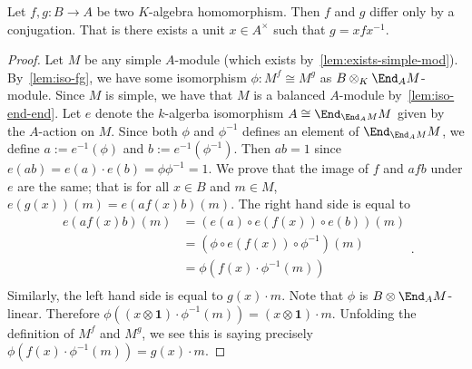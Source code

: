 \begin{theorem}\label{thm:skolem-noether}
  Let $f, g : B \to A$ be two $K$-algebra homomorphism. Then $f$ and $g$ differ
  only by a conjugation. That is there exists a unit $x \in A^{\times}$ such
  that $g = x f x^{-1}$.
  \leanok
\end{theorem}

\begin{proof}
  Let $M$ be any simple $A$-module (which exists
  by~\cref{lem:exists-simple-mod}). By~\cref{lem:iso-fg}, we have some
  isomorphism $\phi : M^{f}\cong M^{g}$ as $B\otimes_{K}\End_{A}M$-module. Since
  $M$ is simple, we have that $M$ is a balanced $A$-module
  by~\cref{lem:iso-end-end}. Let $e$ denote the $k$-algerba isomorphism
  $A \cong \End_{\End_{A}M}M$ given by the $A$-action on $M$. Since both $\phi$
  and $\phi^{-1}$ defines an element of $\End_{\End_{A}M}M$, we define
  $a := e^{-1}(\phi)$ and $b := e^{-1}(\phi^{-1})$. Then $ab = 1$ since
  $e(ab)=e(a)\cdot e(b)=\phi\phi^{-1}=1$. We prove that the image of $f$ and
  $afb$ under $e$ are the same; that is for all $x\in B$ and $m\in M$,
  $e(g(x))(m) = e(a f(x) b)(m)$. The right hand side is equal to
  \[
    \begin{aligned}
      e(af(x)b)(m) &=\left(e(a)\circ e(f(x))\circ e(b)\right)(m) \\
                   &=\left(\phi\circ e(f(x))\circ \phi^{-1}\right)(m)\\
                   &=\phi\left(f(x)\cdot\phi^{-1}(m)\right) \\
    \end{aligned}.
  \]
  Similarly, the left hand side is equal to $g(x)\cdot m$. Note that $\phi$ is
  $B\otimes \End_{A}M$-linear. Therefore
  $\phi\left(\left(x\otimes\mathbf{1}\right)\cdot \phi^{-1}(m)\right) = \left(x\otimes\mathbf{1}\right)\cdot m$.
  Unfolding the definition of $M^{f}$ and $M^{g}$, we see this is saying
  precisely $\phi\left(f(x)\cdot\phi^{-1}(m)\right)=g(x)\cdot m$.
\end{proof}



